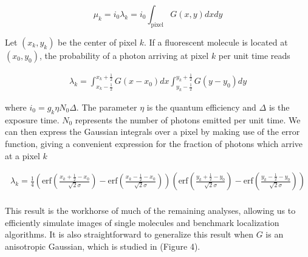 \documentclass{ucetd}
\begin{document}
\begin{equation}
\mu_{k} = i_{0}\lambda_{k} = i_{0}\int_{\mathrm{pixel}} G(x,y)dxdy
\end{equation}


Let $(x_{k},y_{k})$ be the center of pixel $k$. If a fluorescent molecule is located at $(x_{0},y_{0})$, the probability of a photon arriving at pixel $k$ per unit time reads

\begin{align*}
\lambda_{k} = \int_{x_{k}-\frac{1}{2}}^{x_{k}+\frac{1}{2}}G(x-x_{0})dx \int_{y_{k}-\frac{1}{2}}^{y_{k}+\frac{1}{2}} G(y-y_{0})dy
\end{align*}

where $i_{0} = g_{k}\eta N_{0}\Delta$. The parameter $\eta$ is the quantum efficiency and $\Delta$ is the exposure time. $N_{0}$ represents the number of photons emitted per unit time. We can then express the Gaussian integrals over a pixel by making use of the error function, giving a convenient expression for the fraction of photons which arrive at a pixel $k$

\begin{align*}
\lambda_{k} = \frac{1}{4}\left(\mathrm{erf}\left(\frac{x_{k}+\frac{1}{2}-x_{0}}{\sqrt{2}\sigma}\right) -\mathrm{erf}\left(\frac{x_{k}-\frac{1}{2}-x_{0}}{\sqrt{2}\sigma}\right)\right)\left(\mathrm{erf}\left(\frac{y_{k}+\frac{1}{2}-y_{0}}{\sqrt{2}\sigma}\right) -\mathrm{erf}\left(\frac{y_{k}-\frac{1}{2}-y_{0}}{\sqrt{2}\sigma}\right)\right)\\
\end{align*}

This result is the workhorse of much of the remaining analyses, allowing us to efficiently simulate images of single molecules and benchmark localization algorithms. It is also straightforward to generalize this result when $G$ is an anisotropic Gaussian, which is studied in (Figure 4).
\end{document}
